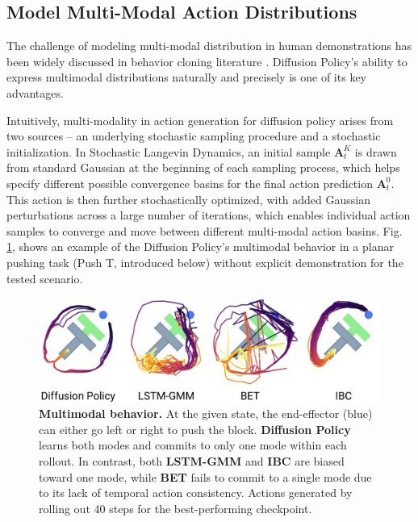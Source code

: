 \subsection{Model Multi-Modal Action Distributions}
\label{sec:multimodal}
The challenge of modeling multi-modal distribution in human demonstrations has been widely discussed in behavior cloning literature \cite{ibc,bet,robomimic}. Diffusion Policy's ability to express multimodal distributions naturally and precisely is one of its key advantages.


Intuitively, multi-modality in action generation for diffusion policy arises from two sources -- an underlying stochastic sampling procedure and a stochastic initialization. In Stochastic Langevin Dynamics, an initial sample $\mathbf{A}^K_t$ is drawn from standard Gaussian at the beginning of each sampling process, which helps specify different possible convergence basins for the final action prediction $\mathbf{A}^0_t$. This action is then further stochastically optimized, with added Gaussian perturbations across a large number of iterations, which enables individual action samples to converge and move between different multi-modal action basins.
Fig. \ref{fig:multimodal}, shows an example of the Diffusion Policy's multimodal behavior in a planar pushing task (Push T, introduced below) without explicit demonstration for the tested scenario.

\begin{figure}[h]
\centering
\includegraphics[width=0.98\linewidth]{figure/multimodal_sim.pdf} %

\caption{\label{fig:multimodal}
\textbf{Multimodal behavior.} At the given state, the end-effector (blue) can either go left or right to push the block.
\textbf{Diffusion Policy} learns both modes and commits to only one mode within each rollout.
In contrast, both \textbf{LSTM-GMM} \cite{robomimic} and \textbf{IBC} \cite{ibc} are biased toward one mode, while \textbf{BET} \cite{bet} fails to commit to a single mode due to its lack of temporal action consistency.
Actions generated by rolling out 40 steps for the best-performing checkpoint.
}
\vspace{-2mm}
\end{figure}
